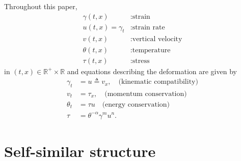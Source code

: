 \documentclass[a4paper,11pt]{article}
\begin{document}
Throughout this paper,
\begin{equation} \label{eq:vars}
\begin{aligned}
 \gamma(t,x) &: \text{strain}\\
 u(t,x)=\gamma_t &: \text{strain rate}\\
 v(t,x) &: \text{vertical velocity}\\
 \theta(t,x) &: \text{temperature}\\
 \tau(t,x) &: \text{stress}
\end{aligned}
\end{equation}
in $(t,x)\in \mathbb{R}^+ \times \mathbb{R}$ and equations describing the deformation are given by
\begin{align}
 \gamma_t &= u\triangleq v_x, \quad \text{(kinematic compatibility)} 	\label{eq:g}\\
 v_t &= \tau_x, \quad \text{(momentum conservation)} 	\label{eq:v}\\
 \theta_t &= \tau u \quad \text{(energy conservation)}	\label{eq:th}\\
 \tau &=\theta^{-\alpha}\gamma^m u^n.			\label{eq:tau}
\end{align}

\section{Self-similar structure}
\end{document}
